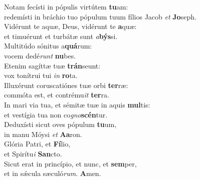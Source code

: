 \evenverse Notam fecísti in pópulis virtútem \textbf{tu}am:~\*\\
\evenverse redemísti in bráchio tuo pópulum tuum fílios Jacob \textit{et} \textbf{Jo}seph.\\
\oddverse Vidérunt te aquæ, Deus, vidérunt te \textbf{a}quæ:~\*\\
\oddverse et timuérunt et turbátæ sunt \textit{a}\textbf{býs}si.\\
\evenverse Multitúdo sónitus a\textbf{quá}rum:~\*\\
\evenverse vocem dedé\textit{runt} \textbf{nu}bes.\\
\oddverse Etenim sagíttæ tuæ \textbf{trán}seunt:~\*\\
\oddverse vox tonítrui tui \textit{in} \textbf{ro}ta.\\
\evenverse Illuxérunt coruscatiónes tuæ orbi \textbf{ter}ræ:~\*\\
\evenverse commóta est, et contrému\textit{it} \textbf{ter}ra.\\
\oddverse In mari via tua, et sémitæ tuæ in aquis \textbf{mul}tis:~\*\\
\oddverse et vestígia tua non co\textit{gno}\textbf{scén}tur.\\
\evenverse Deduxísti sicut oves pópulum \textbf{tu}um,~\*\\
\evenverse in manu Móysi \textit{et} \textbf{A}\textbf{a}ron.\\
\oddverse Glória Patri, et \textbf{Fí}lio,~\*\\
\oddverse et Spirítu\textit{i} \textbf{San}cto.\\
\evenverse Sicut erat in princípio, et nunc, et \textbf{sem}per,~\*\\
\evenverse et in sǽcula sæculó\textit{rum}. \textbf{A}men.\\

